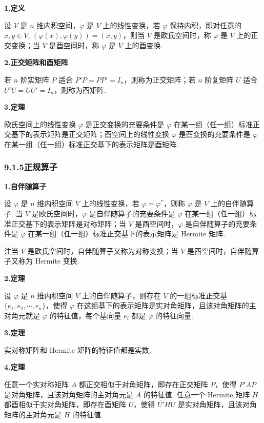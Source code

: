 \documentclass[UTF8, 12pt, fontset=fandol, oneside]{ctexart}
\begin{document}
\noindent\textbf{1.\quad 定义}

设 $V$ 是 $n$ 维内积空间，$\varphi$ 是 $V$ 上的线性变换，若 $\varphi$ 保持内积，即对任意的 $x,y\in V$, $(\varphi(x),\varphi(y))=(x,y)$，则当 $V$ 是欧氏空间时，称 $\varphi$ 是 $V$ 上的正交变换；当 $V$ 是酉空间时，称 $\varphi$ 是 $V$ 上的酉变换.

\noindent\textbf{2.\quad 正交矩阵和酉矩阵}

若 $n$ 阶实矩阵 $P$ 适合 $P'P=PP'=I_n$，则称为正交矩阵；若 $n$ 阶复矩阵 $U$ 适合 $\overline{U'}U=U\overline{U'}=I_n$，则称为酉矩阵.

\noindent\textbf{3.\quad 定理}

欧氏空间上的线性变换 $\varphi$ 是正交变换的充要条件是 $\varphi$ 在某一组（任一组）标准正交基下的表示矩阵是正交矩阵；酉空间上的线性变换 $\varphi$ 是酉变换的充要条件是 $\varphi$ 在某一组（任一组）标准正交基下的表示矩阵是酉矩阵.

\subsubsection*{9.1.5\quad 正规算子}

\noindent\textbf{1.\quad 自伴随算子}

设 $\varphi$ 是 $n$ 维内积空间 $V$ 上的线性变换，若 $\varphi=\varphi^*$，则称 $\varphi$ 是 $V$ 上的自伴随算子. 当 $V$ 是欧氏空间时，$\varphi$ 是自伴随算子的充要条件是 $\varphi$ 在某一组（任一组）标准正交基下的表示矩阵是对称矩阵；当 $V$ 是酉空间时，$\varphi$ 是自伴随算子的充要条件是 $\varphi$ 在某一组（任一组）标准正交基下的表示矩阵是 Hermite 矩阵.

注\quad 当 $V$ 是欧氏空间时，自伴随算子又称为对称变换；当 $V$ 是酉空间时，自伴随算子又称为 Hermite 变换.

\noindent\textbf{2.\quad 定理}

设 $\varphi$ 是 $n$ 维内积空间 $V$ 上的自伴随算子，则存在 $V$ 的一组标准正交基 $\{e_1,e_2,\cdots,e_n\}$，使得 $\varphi$ 在这组基下的表示矩阵是实对角矩阵，且该对角矩阵的主对角元就是 $\varphi$ 的特征值，每个基向量 $e_i$ 都是 $\varphi$ 的特征向量.

\noindent\textbf{3.\quad 定理}

实对称矩阵和 Hermite 矩阵的特征值都是实数.

\noindent\textbf{4.\quad 定理}

任意一个实对称矩阵 $A$ 都正交相似于对角矩阵，即存在正交矩阵 $P$，使得 $P'AP$ 是对角矩阵，且该对角矩阵的主对角元是 $A$ 的特征值. 任意一个 Hermite 矩阵 $H$ 都酉相似于实对角矩阵，即存在酉矩阵 $U$，使得 $\overline{U'}HU$ 是实对角矩阵，且该对角矩阵的主对角元是 $H$ 的特征值.
\end{document}
